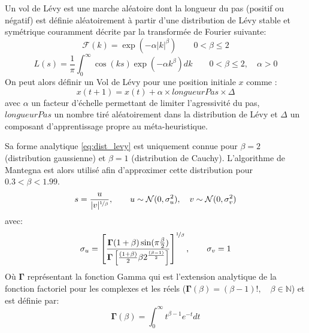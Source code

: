 \begin{Def}\label{def:vol_levy}
Un vol de Lévy est une marche aléatoire dont la longueur du pas (positif ou négatif)
est définie aléatoirement à partir d’une distribution de Lévy stable et symétrique
couramment décrite par la transformée de Fourier suivante:
\begin{equation}\label{eq:fourier_levy}
    \mathcal{F}(k) = \exp(-\alpha\mathopen{|}k\mathclose{|}^{\beta}) \qquad  0 < \beta \leq 2
\end{equation}
\begin{equation}\label{eq:dist_levy}
    L(s) = \frac{1}{\pi} \int_{0}^{\infty} \cos(k s)\exp(-\alpha k^{\beta}) dk \qquad  0 < \beta \leq 2, \quad \alpha > 0
\end{equation}
On peut alors définir un Vol de Lévy pour une position initiale $x$ comme :
\begin{equation}
  x(t + 1) = x(t) + \alpha \times longueurPas \times \Delta
\end{equation}
avec $\alpha$ un facteur d’échelle permettant de limiter l’agressivité du pas,
$longueurPas$ un nombre tiré aléatoirement dans la distribution de Lévy et $\Delta$
un composant d’apprentissage propre au méta-heuristique.
\end{Def}

Sa forme analytique \eqref{eq:dist_levy} est uniquement connue pour $\beta = 2$ (distribution gaussienne)
et $\beta = 1$ (distribution de Cauchy).
L’algorithme de Mantegna \parencite{Mantegna19944677} est alors utilisé afin d’approximer cette distribution
pour $0.3 < \beta < 1.99$.
\begin{equation}\label{eq:step_len}
    s = \frac{u}{\mathopen{|}v\mathclose{|}^{\nicefrac{1}{\beta}}}, \qquad u \sim \mathcal{N}(0, \sigma_{u}^{2}), \quad v \sim \mathcal{N}(0, \sigma_{v}^{2})
\end{equation}
avec:
\begin{equation}\label{eq:sigmas}
    \sigma_{u} = \left[ \frac{\mathbf{\Gamma}(1+\beta)\sin(\pi\frac{\beta}{2})}%
                             {\mathbf{\Gamma} \left[\frac{(1+\beta)}{2}\beta 2^{\frac{(\beta-1)}{2}}\right]}\right]^{\nicefrac{1}{\beta}},%
    \qquad \sigma_{v} = 1
\end{equation}
Où $\mathbf{\Gamma}$ représentant la fonction Gamma qui est l’extension analytique de la fonction factoriel pour
les complexes et les réels ($\mathbf{\Gamma}(\beta) = (\beta -1)!, \quad \beta\in \mathbb{N}$) et est définie par:
\begin{equation}
    \mathbf{\Gamma}(\beta) = \int_{0}^{\infty} t^{\beta-1}e^{-t} dt
\end{equation}

